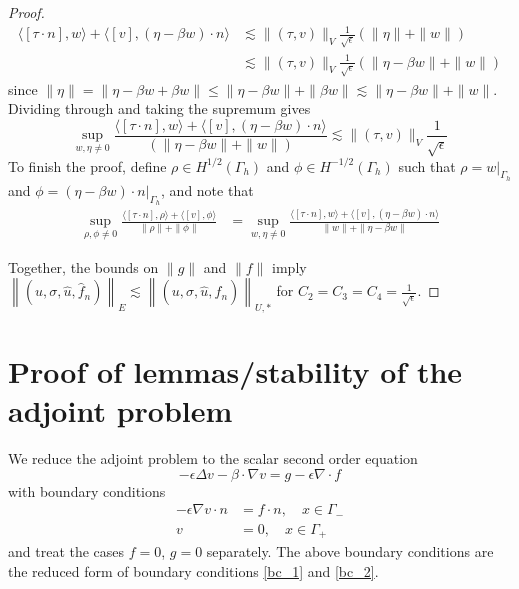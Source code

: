 \documentclass[11pt,onecolumn]{scrartcl}
\newcommand{\grad}{\nabla}
\renewcommand{\div}{\grad \cdot}
\begin{document}
\begin{proof}
\begin{align*}
\langle [\tau\cdot n],w\rangle + \langle [v],\left(\eta - \beta w\right)\cdot n\rangle &\lesssim \|\left(\tau,v\right)\|_V\frac{1}{\sqrt{\epsilon}}\left(\|\eta\| + \|w\|\right)\\
&\lesssim \|\left(\tau,v\right)\|_V\frac{1}{\sqrt{\epsilon}}\left(\|\eta-\beta w\| + \|w\|\right)
\end{align*}
since $\|\eta\| = \|\eta - \beta w + \beta w\| \leq \|\eta - \beta w\| + \|\beta w\| \lesssim \|\eta-\beta w\| + \|w\|$.  Dividing through and taking the supremum gives
\[
\sup_{w,\eta \neq 0} \frac{\langle[\tau\cdot n],w\rangle + \langle [v],\left(\eta - \beta w\right)\cdot n\rangle}{\left(\|\eta-\beta w\| + \|w\|\right)} \lesssim \|\left(\tau,v\right)\|_V\frac{1}{\sqrt{\epsilon}}
\]
To finish the proof, define $\rho \in H^{1/2}(\Gamma_h)$ and $\phi \in H^{-1/2}(\Gamma_h)$ such that $\rho = \left.w\right|_{\Gamma_h}$ and $\phi = \left.(\eta-\beta w)\cdot n\right|_{\Gamma_h}$, and note that
\begin{align*}
\sup_{\rho,\phi \neq 0} \frac{\langle [\tau\cdot n],\rho\rangle + \langle [v],\phi \rangle}{\|\rho\|+\|\phi\|} &= \sup_{w,\eta \neq 0} \frac{\langle [\tau\cdot n],w\rangle + \langle [v],\left(\eta - \beta w\right)\cdot n\rangle}{ \|w\|+\|\eta-\beta w\|} 
\end{align*}

Together, the bounds on $\|g\|$ and $\|f\|$ imply $\left\|\left(u,\sigma,\widehat{u},\widehat{f}_n\right)\right\|_{E} \lesssim \left\|\left(u,\sigma,\widehat{u},\widehat{f}_n\right)\right\|_{U,*}$ for $C_2 = C_3 = C_4 = \frac{1}{\sqrt{\epsilon}}$.  
\end{proof}


\section{Proof of lemmas/stability of the adjoint problem}

We reduce the adjoint problem to the scalar second order equation
\begin{equation}
- \epsilon \Delta v - \beta \cdot \grad v = g - \epsilon \div f \label{adjoint}
\end{equation}
with boundary conditions
\begin{align}
- \epsilon \grad v \cdot n &=f\cdot n, \quad x\in \Gamma_- \label{reducedbc_1}\\ 
v &= 0, \quad x\in \Gamma_+ \label{reducedbc_2}
\end{align}
and treat the cases $f=0$, $g=0$ separately.  The above boundary conditions are the reduced form of boundary conditions \eqref{bc_1} and \eqref{bc_2}. 
\end{document}
